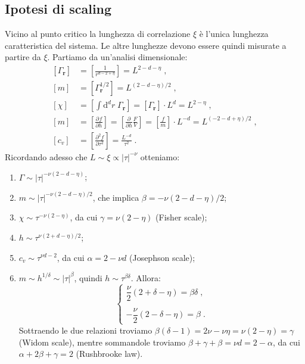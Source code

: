 \documentclass[10pt,a4paper]{report}
\theoremstyle{definition}
\newcommand{\pdev}[3][]{\frac{\partial^{#1} #2}{\partial #3^{#1}}}
\numberwithin{equation}{section}
\newcommand{\diff}[1][]{\mathrm{d}#1}
\begin{document}
\subsection{Ipotesi di scaling}
Vicino al punto critico la lunghezza di correlazione $\xi$ è l'unica lunghezza caratteristica del sistema. Le altre lunghezze devono essere quindi misurate a partire da $\xi$. Partiamo da un'analisi dimensionale:
\begin{align*}
\left[\Gamma_{\mathbf{r}}\right]&=\left[\frac{1}{r^{d-2+\eta}}\right]=L^{2-d-\eta}\;, \\
[m] &= [\Gamma_{\mathbf{r}}^{1/2}]=L^{(2-d-\eta)/2}\;, \\
[\chi] &= \left[\int\diff^d{r}\;\Gamma_{\mathbf{r}}\right]=[\Gamma_{\mathbf{r}}]\cdot L^d=L^{2-\eta}\;, \\
[m] &=\left[\pdev{f}{h}\right]=\left[\frac{\partial}{\partial h}\frac{F}{V}\right]=\left[\frac{f}{m}\right]\cdot L^{-d}=L^{(-2-d+\eta)/2}\;, \\
[c_v] &=\left[\pdev[2]{f}{\tau}\right]=\frac{L^{-d}}{\tau^2}\;.
\end{align*}
Ricordando adesso che $L\sim \xi\propto |\tau|^{-\nu}$ otteniamo:
\begin{enumerate}
\item $\Gamma\sim |\tau|^{-\nu(2-d-\eta)}$;
\item $m\sim |\tau|^{-\nu(2-d-\eta)/2}$, che implica $\beta=-\nu(2-d-\eta)/2$;
\item $\chi\sim \tau^{-\nu(2-\eta)}$, da cui $\gamma=\nu(2-\eta)$ (Fisher scale);
\item $h\sim \tau^{\nu(2+d-\eta)/2}$;
\item $c_v\sim \tau^{\nu d-2}$, da cui $\alpha=2-\nu d$ (Josephson scale);
\item $m\sim h^{1/\delta}\sim |\tau|^{\beta}$, quindi $h\sim \tau^{\beta\delta}$. Allora:
$$
\begin{cases}
\dfrac{\nu}{2}(2+\delta-\eta)=\beta\delta\;, \\
\\
-\dfrac{\nu}{2}(2-\delta-\eta)=\beta\;.
\end{cases}
$$
Sottraendo le due relazioni troviamo $\beta(\delta-1)=2\nu-\nu\eta=\nu(2-\eta)=\gamma$ (Widom scale), mentre sommandole troviamo $\beta+\gamma+\beta=\nu d=2-\alpha$, da cui $\alpha+2\beta+\gamma=2$ (Rushbrooke law).
\end{enumerate}
\end{document}
